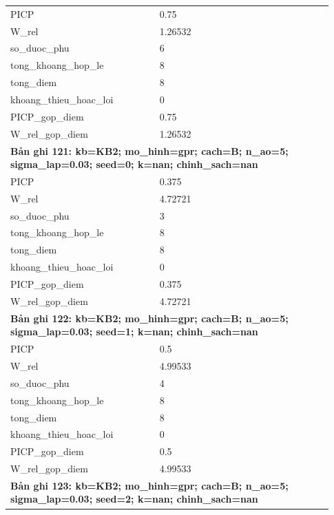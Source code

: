 \begin{longtable}{p{0.43\linewidth}p{0.50\linewidth}}
PICP & 0.75 \\
W\_\allowbreak rel & 1.26532 \\
so\_\allowbreak duoc\_\allowbreak phu & 6 \\
tong\_\allowbreak khoang\_\allowbreak hop\_\allowbreak le & 8 \\
tong\_\allowbreak diem & 8 \\
khoang\_\allowbreak thieu\_\allowbreak hoac\_\allowbreak loi & 0 \\
PICP\_\allowbreak gop\_\allowbreak diem & 0.75 \\
W\_\allowbreak rel\_\allowbreak gop\_\allowbreak diem & 1.26532 \\
\midrule
\multicolumn{2}{p{0.95\linewidth}}{\textbf{Bản ghi 121: kb=KB2; mo\_hinh=gpr; cach=B; n\_ao=5; sigma\_lap=0.03; seed=0; k=nan; chinh\_sach=nan}} \\
PICP & 0.375 \\
W\_\allowbreak rel & 4.72721 \\
so\_\allowbreak duoc\_\allowbreak phu & 3 \\
tong\_\allowbreak khoang\_\allowbreak hop\_\allowbreak le & 8 \\
tong\_\allowbreak diem & 8 \\
khoang\_\allowbreak thieu\_\allowbreak hoac\_\allowbreak loi & 0 \\
PICP\_\allowbreak gop\_\allowbreak diem & 0.375 \\
W\_\allowbreak rel\_\allowbreak gop\_\allowbreak diem & 4.72721 \\
\midrule
\multicolumn{2}{p{0.95\linewidth}}{\textbf{Bản ghi 122: kb=KB2; mo\_hinh=gpr; cach=B; n\_ao=5; sigma\_lap=0.03; seed=1; k=nan; chinh\_sach=nan}} \\
PICP & 0.5 \\
W\_\allowbreak rel & 4.99533 \\
so\_\allowbreak duoc\_\allowbreak phu & 4 \\
tong\_\allowbreak khoang\_\allowbreak hop\_\allowbreak le & 8 \\
tong\_\allowbreak diem & 8 \\
khoang\_\allowbreak thieu\_\allowbreak hoac\_\allowbreak loi & 0 \\
PICP\_\allowbreak gop\_\allowbreak diem & 0.5 \\
W\_\allowbreak rel\_\allowbreak gop\_\allowbreak diem & 4.99533 \\
\midrule
\multicolumn{2}{p{0.95\linewidth}}{\textbf{Bản ghi 123: kb=KB2; mo\_hinh=gpr; cach=B; n\_ao=5; sigma\_lap=0.03; seed=2; k=nan; chinh\_sach=nan}} \\

\end{longtable}
